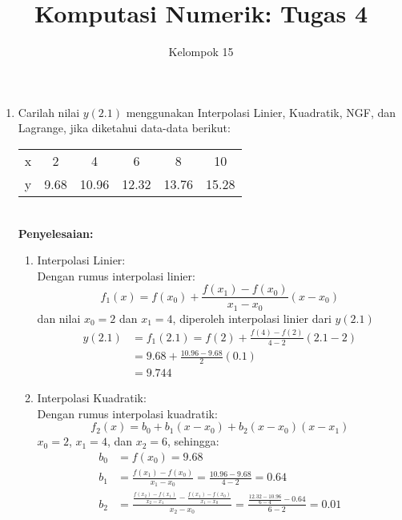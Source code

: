 \documentclass{article}
\title{\textbf{Komputasi Numerik: Tugas 4}}
\author{Kelompok 15}
\date{}
\newcommand{\penyelesaian}{\textbf{Penyelesaian: }}
\begin{document}
\maketitle

\begin{enumerate}
    \item Carilah nilai $y(\num{2,1})$ menggunakan Interpolasi Linier, Kuadratik, NGF, dan Lagrange, jika diketahui data-data berikut: \\
    \begin{tabular}{ c c c c c c }
        x & 2 & 4 & 6 & 8 & 10 \\
        y & \num{9,68} & \num{10,96} & \num{12,32} & \num{13,76} & \num{15,28} \\
    \end{tabular} \\
    \penyelesaian
    \begin{enumerate}
        \item Interpolasi Linier: \\
        Dengan rumus interpolasi linier:
        \begin{equation*}
            f_1(x) = f(x_0) + \frac{f(x_1) - f(x_0)}{x_1 - x_0}(x - x_0)
        \end{equation*}
        dan nilai $x_0 = 2$ dan $x_1 = 4$, diperoleh interpolasi linier dari $y(\num{2,1})$
        \begin{align*}
            y(\num{2,1}) &= f_1(\num{2,1}) = f(2) + \frac{f(4) - f(2)}{4 - 2}(\num{2,1} - 2) \\
            &= \num{9,68} + \frac{\num{10,96} - \num{9,68}}{2}(\num{0,1}) \\
            &= \num{9,744}
        \end{align*}
        
        \item Interpolasi Kuadratik: \\
        Dengan rumus interpolasi kuadratik:
        \begin{equation*}
            f_2(x) = b_0 + b_1(x - x_0) + b_2(x - x_0)(x - x_1)
        \end{equation*}
        $x_0 = 2$, $x_1 = 4$, dan $x_2 = 6$, sehingga:
        \begin{align*}
            b_0 &= f(x_0) = \num{9,68} \\
            b_1 &= \frac{f(x_1) - f(x_0)}{x_1 - x_0} = \frac{\num{10,96} - \num{9,68}}{4 - 2} = \num{0,64} \\
            b_2 &= \frac{\frac{f(x_2) - f(x_1)}{x_2 - x_1} - \frac{f(x_1) - f(x_0)}{x_1 - x_0}}{x_2 - x_0} = \frac{\frac{\num{12,32} - \num{10,96}}{6 - 4} - \num{0,64}}{6 - 2} = \num{0,01}
        \end{align*}


\end{enumerate}
\end{enumerate}
\end{document}

